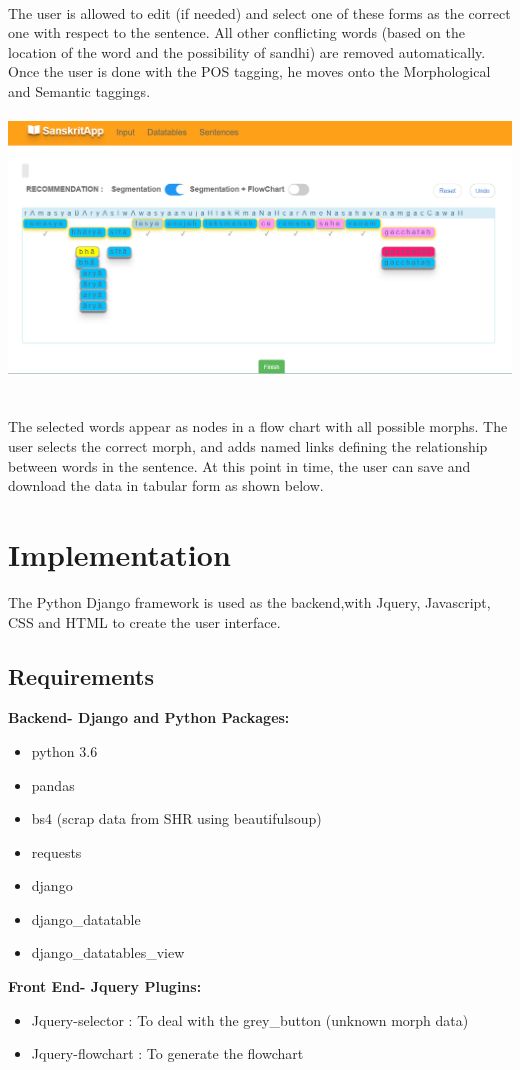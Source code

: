 \documentclass[12pt]{article}
\begin{document}
\\The user is allowed to edit (if needed) and select one of these forms as the correct one with respect to the sentence. All other conflicting words (based on the location of the word and the possibility of sandhi) are removed automatically. Once the user is done with the POS tagging, he moves onto the Morphological and Semantic taggings.\\ \\

\includegraphics[width=150mm,scale=20]{capture3}\\ \\

\\The selected words appear as nodes in a flow chart with all possible morphs. The user selects the correct morph, and adds named links defining the relationship between words in the sentence. At this point in time, the user can save and download the data in tabular form as shown below. 

\section{Implementation}
The Python Django framework is used as the backend,with Jquery, Javascript, CSS and HTML to create the user interface. 
\subsection{Requirements}
\textbf{Backend- Django and Python Packages:}
\begin{itemize}
	\item python 3.6
	\item pandas
	\item bs4 (scrap data from SHR using beautifulsoup)
	\item requests
	\item django
	\item django\_datatable
	\item django\_datatables\_view
\end{itemize}
\textbf{Front End- Jquery Plugins:}
\begin{itemize}
	\item Jquery-selector : To deal with the grey\_button (unknown morph data)
	\item Jquery-flowchart : To generate the flowchart
\end{itemize}
\end{document}
